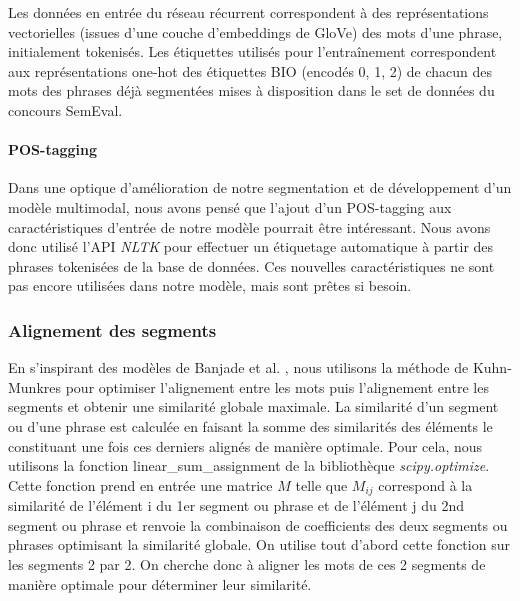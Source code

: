 \documentclass[a4paper, twoside, 11pt]{article}
\begin{document}
Les données en entrée du réseau récurrent correspondent à des représentations vectorielles (issues d’une couche d’embeddings de GloVe) des mots d’une phrase, initialement tokenisés. Les étiquettes utilisés pour l'entraînement correspondent aux représentations \og one-hot  \fg{} des étiquettes BIO (encodés 0, 1, 2) de chacun des mots des phrases déjà segmentées mises à disposition dans le set de données du concours SemEval.

\paragraph{POS-tagging}

Dans une optique d’amélioration de notre segmentation et de développement d'un modèle multimodal, nous avons pensé que l’ajout d’un \og POS-tagging \fg{} aux caractéristiques d’entrée de notre modèle pourrait être intéressant. Nous avons donc utilisé l’API \textit{NLTK} pour effectuer un étiquetage automatique à partir des phrases tokenisées de la base de données. Ces nouvelles caractéristiques ne sont pas encore utilisées dans notre modèle, mais sont prêtes si besoin.

\subsubsection{Alignement des segments}

En s’inspirant des modèles de Banjade et al. \cite{banjade}  \cite{banjadeautre}, nous utilisons la méthode de Kuhn-Munkres pour optimiser l’alignement entre les mots puis l’alignement entre les segments et obtenir une similarité globale maximale. La similarité d’un segment ou d’une phrase est calculée en faisant la somme des similarités des éléments le constituant une fois ces derniers alignés de manière optimale. Pour cela, nous utilisons la fonction \og linear\_sum\_assignment \fg{} de la bibliothèque \textit{scipy.optimize}. Cette fonction prend en entrée une matrice $M$ telle que $M_{ij}$ correspond à la similarité de l’élément i du 1er segment ou phrase et de l’élément j du 2nd segment ou phrase et renvoie la combinaison de coefficients des deux segments ou phrases optimisant la similarité globale. On utilise tout d’abord cette fonction sur les segments 2 par 2. On cherche donc à aligner les mots de ces 2 segments de manière optimale pour déterminer leur similarité.
\end{document}
